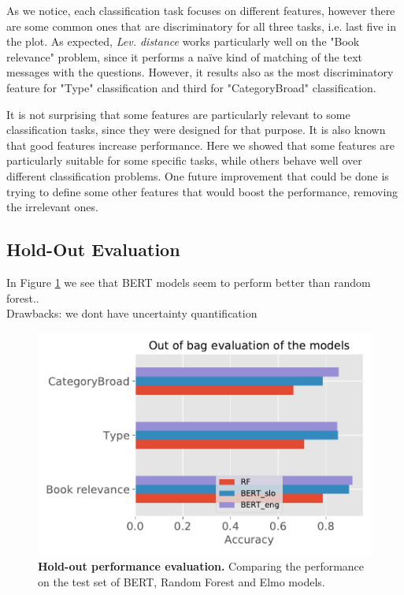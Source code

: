 \documentclass[11pt,a4paper]{article}
\begin{document}
As we notice, each classification task focuses on different features, however there are some common ones that are discriminatory for all three tasks, i.e. last five in the plot. As expected, \textit{Lev. distance} works particularly well on the "Book relevance" problem, since it performs a naïve kind of matching of the text messages with the questions. However, it results also as the most discriminatory feature for "Type" classification and third for "CategoryBroad" classification.

It is not surprising that some features are particularly relevant to some classification tasks, since they were designed for that purpose. It is also known that good features increase performance. Here we showed that some features are particularly suitable for some specific tasks, while others behave well over different classification problems. One future improvement that could be done is trying to define some other features that would boost the performance, removing the irrelevant ones.

\subsection{Hold-Out Evaluation}
In Figure \ref{fig:h-o_eval} we see that BERT models seem to perform better than random forest..\\
Drawbacks: we dont have uncertainty quantification

\begin{figure}[tbh]
    \centering
    \includegraphics[width = \linewidth]{../results/hold_out_eval.pdf}
    \caption{\textbf{Hold-out performance evaluation.} Comparing the performance on the test set of BERT, Random Forest and Elmo models.}
    \label{fig:h-o_eval}
\end{figure}
\end{document}

